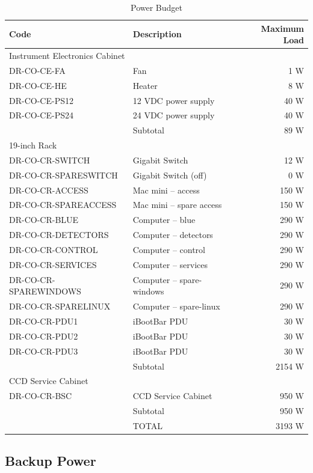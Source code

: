 \documentclass{article}
\begin{document}
\begin{table}[p]
\caption{Power Budget}
\label{table:power-budget}
\begin{center}
\small
\begin{tabular}{llr}
\hline
Code&Description&Maximum Load\\
\hline
\multicolumn{3}{l}{Instrument Electronics Cabinet}\\
\hline
DR-CO-CE-FA&Fan&1 W\\
DR-CO-CE-HE&Heater&8 W\\
DR-CO-CE-PS12&12 VDC power supply&40 W\\
DR-CO-CE-PS24&24 VDC power supply&40 W\\
\hline
&Subtotal&89 W\\
\hline
\multicolumn{3}{l}{19-inch Rack}\\
\hline
DR-CO-CR-SWITCH&Gigabit Switch&12 W\\
DR-CO-CR-SPARESWITCH&Gigabit Switch (off)&0 W\\
DR-CO-CR-ACCESS&Mac mini -- access&150 W\\
DR-CO-CR-SPAREACCESS&Mac mini -- spare access&150 W\\
DR-CO-CR-BLUE&Computer -- blue&290 W\\
DR-CO-CR-DETECTORS&Computer -- detectors&290 W\\
DR-CO-CR-CONTROL&Computer -- control&290 W\\
DR-CO-CR-SERVICES&Computer -- services&290 W\\
DR-CO-CR-SPAREWINDOWS&Computer -- spare-windows&290 W\\
DR-CO-CR-SPARELINUX&Computer -- spare-linux&290 W\\
DR-CO-CR-PDU1&iBootBar PDU&30 W\\
DR-CO-CR-PDU2&iBootBar PDU&30 W\\
DR-CO-CR-PDU3&iBootBar PDU&30 W\\
\hline
&Subtotal&2154 W\\
\hline
\multicolumn{3}{l}{CCD Service Cabinet}\\
\hline
DR-CO-CR-BSC&CCD Service Cabinet&950 W\\
\hline
&Subtotal&950 W\\
\hline
&TOTAL&3193 W\\
\hline
\end{tabular}
\end{center}
\end{table}

\subsection{Backup Power}
\end{document}

